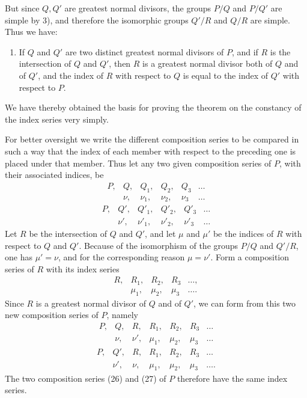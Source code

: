 \documentclass[11pt]{article}
\begin{document}
But since $Q,Q'$ are greatest normal divisors, the groups $P/Q$ and $P/Q'$ are simple by 3), and therefore the isomorphic groups $Q'/R$ and $Q/R$ are simple. Thus we have:
\begin{enumerate}[resume,label=\arabic*.]
\item If $Q$ and $Q'$ are two distinct greatest normal divisors of $P$, and if $R$ is the intersection of $Q$ and $Q'$, then $R$ is a greatest normal divisor both of $Q$ and of $Q'$, and the index of $R$ with respect to $Q$ is equal to the index of $Q'$ with respect to $P$.
\end{enumerate}

We have thereby obtained the basis for proving the theorem on the constancy of the index series very simply.

For better oversight we write the different composition series to be compared in such a way that the index of each member with respect to the preceding one is placed under that member. Thus let any two given composition series of $P$, with their associated indices, be
\begin{equation}
\begin{array}{cccccc}
P,&Q,&Q_1,&Q_2,&Q_3&\ldots\\
&\nu,&\nu_1,&\nu_2,&\nu_3&\ldots
\end{array}
\tag{23}
\end{equation}
\begin{equation}
\begin{array}{cccccc}
P,&Q',&Q'_1,&Q'_2,&Q'_3&\ldots\\
&\nu',&\nu'_1,&\nu'_2,&\nu'_3&\ldots
\end{array}
\tag{24}
\end{equation}
Let $R$ be the intersection of $Q$ and $Q'$, and let $\mu$ and $\mu'$ be the indices of $R$ with respect to $Q$ and $Q'$. Because of the isomorphism of the groups $P/Q$ and $Q'/R$, one has $\mu'=\nu$, and for the corresponding reason $\mu=\nu'$. Form a composition series of $R$ with its index series
\begin{equation}
\begin{array}{ccccc}
R,&R_1,&R_2,&R_3&\ldots,\\
&\mu_1,&\mu_2,&\mu_3&\ldots.
\end{array}
\tag{25}
\end{equation}
Since $R$ is a greatest normal divisor of $Q$ and of $Q'$, we can form from this two new composition series of $P$, namely
\begin{equation}
\begin{array}{ccccccc}
P,&Q,&R,&R_1,&R_2,&R_3&\ldots\\
&\nu,&\nu',&\mu_1,&\mu_2,&\mu_3&\ldots
\end{array}
\tag{26}
\end{equation}
\begin{equation}
\begin{array}{ccccccc}
P,&Q',&R,&R_1,&R_2,&R_3&\ldots\\
&\nu',&\nu,&\mu_1,&\mu_2,&\mu_3&\ldots.
\end{array}
\tag{27}
\end{equation}
The two composition series (26) and (27) of $P$ therefore have the same index series.
\end{document}
